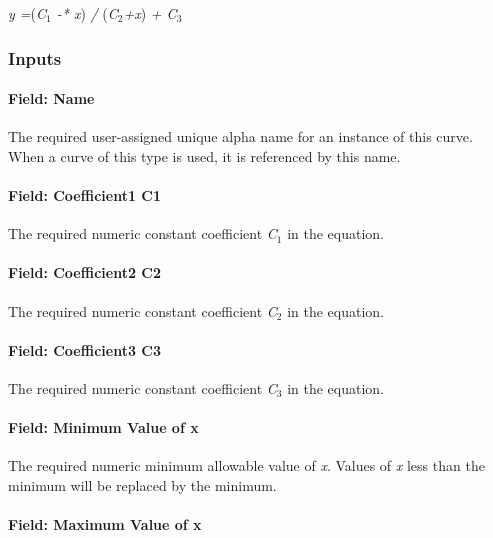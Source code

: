 \emph{y =}(\emph{C\(_{1}\) -* x}) \emph{/} (\emph{C\(_{2}\)+x}) \emph{+ C\(_{3}\)}

\subsubsection{Inputs}\label{inputs-15-008}

\paragraph{Field: Name}\label{field-name-15-005}

The required user-assigned unique alpha name for an instance of this curve. When a curve of this type is used, it is referenced by this name.

\paragraph{Field: Coefficient1 C1}\label{field-coefficient1-c1-2}

The required numeric constant coefficient \emph{C\(_{1}\)} in the equation.

\paragraph{Field: Coefficient2 C2}\label{field-coefficient2-c2-2}

The required numeric constant coefficient \emph{C\(_{2}\)} in the equation.

\paragraph{Field: Coefficient3 C3}\label{field-coefficient3-c3-2}

The required numeric constant coefficient \emph{C\(_{3}\)} in the equation.

\paragraph{Field: Minimum Value of x}\label{field-minimum-value-of-x-14}

The required numeric minimum allowable value of \emph{x}. Values of \emph{x} less than the minimum will be replaced by the minimum.

\paragraph{Field: Maximum Value of x}\label{field-maximum-value-of-x-15}

